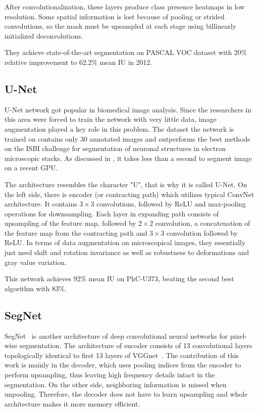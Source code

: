 After convolutionalization, these layers produce class presence heatmaps in low resolution.
Some spatial information is lost because of pooling or strided convolutions,
so the mask must be upsampled at each stage using billinearly initialized deconvolutions.

They achieve state-of-the-art segmentation on PASCAL VOC dataset
\cite{bib:everingham2010pascal} with 20\% relative improvement to 62.2\% mean IU in 2012.

\subsection{U-Net}
\label{sec:semantic_seg_cnn:unet}

U-Net network \cite{bib:ronneberger2015u} got popular in biomedical image analysis.
Since the researchers in this area were forced to train the network with very little data,
image augmentation played a key role in this problem. The dataset the network is trained
on contains only 30 annotated images and outperforms the best methods on the ISBI challenge
for segmentation of neuronal structures in electron microscopic stacks. As discussed in
\cite{bib:ronneberger2015u}, it takes less than a second to segment image on a recent
GPU.

The architecture resembles the character "U", that is why it is called U-Net. On the left
side, there is encoder (or contracting path) which utilizes typical ConvNet architecture.
It contains $3\times3$ convolutions, followed by ReLU and max-pooling operations
for downsampling. Each layer in expanding path consists of upsampling of the feature map,
followed by $2\times2$ convolution, a concatenation of the feature map from the
contracting path and $3\times3$ convolution followed by ReLU. In terms of
data augmentation on microscopical images, they essentially just need
shift and rotation invariance as well as robustness to deformations and gray value
variation.

This network achieves 92\% mean IU on PhC-U373, beating the second best algorithm
with 83\%.

\subsection{SegNet}
\label{sec:semantic_seg_cnn:segnet}

SegNet~\cite{bib:badrinarayanan2017segnet} is another architecture of deep
convolutional neural networks for pixel-wise segmentation. The architecture
of encoder consists of 13 convolutional layers topologically
identical to first 13 layers of VGGnet~\cite{bib:simonyan2014very}.
The contribution of this work is mainly in the decoder, which uses pooling indices from the encoder
to perform upsampling, thus leaving high frequency details intact in the segmentation.
On the other side, neighboring information is missed when unpooling.
Therefore, the decoder does not have to learn upsampling and whole architecture
makes it more memory efficient.

